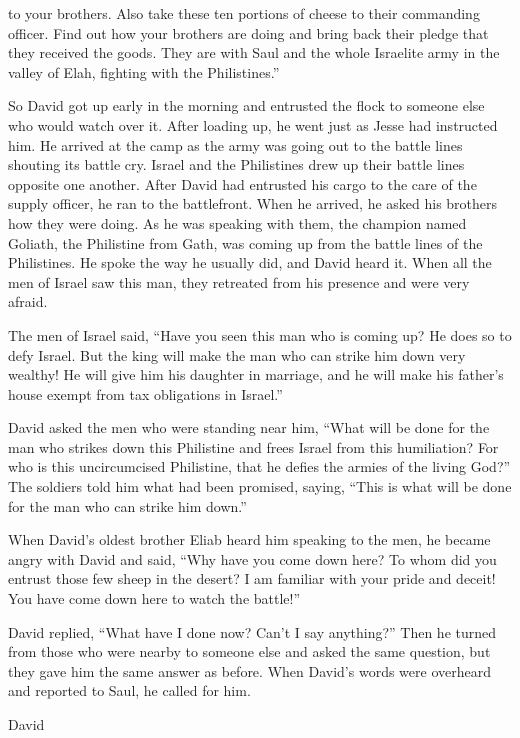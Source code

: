 {to your brothers.
Also take
these
ten
portions
of cheese
to their commanding officer.
Find out
how your brothers
are doing
and bring back their pledge
that they received the goods.
They are
with Saul
and the whole
Israelite
army in the valley
of Elah,
fighting
with
the Philistines.”
\par }{\PP {}So David
got up early
in the morning
and entrusted
the
flock
to someone else who would watch
over
it.
After loading up,
he went
just
as Jesse
had instructed
him. He arrived
at the camp
as the army
was going out
to
the battle lines
shouting
its battle
cry.
Israel
and the Philistines
drew up their battle lines opposite one another.
After David
had entrusted
his
cargo
to the care
of the supply officer, he ran
to the battlefront.
When he arrived,
he asked
his brothers
how they were doing.
As he
was speaking
with
them, the champion
named
Goliath,
the Philistine
from Gath,
was coming up
from the battle lines
of the Philistines.
He spoke
the way
he usually did, and David
heard it.
When all
the men
of Israel
saw
this man,
they retreated
from his presence
and were very
afraid.
\par }{\PP {}The men
of Israel
said,
“Have you seen
this
man
who is coming up? He does so
to defy
Israel.
But the king
will make
the man
who
can strike
him down
very
wealthy! He will give
him his daughter
in marriage, and he will make
his father’s
house
exempt
from tax obligations in Israel.”
\par }{\PP {}David
asked
the men
who were standing
near him,
“What
will be done
for the man
who
strikes
down this Philistine
and frees
Israel
from
this humiliation? For
who
is this
uncircumcised
Philistine,
that
he defies
the armies
of the living
God?”
The soldiers
told
him what
had been promised,
saying, “This
is what
will be done
for the man
who
can strike him down.”
\par }{\PP {}When David’s oldest
brother
Eliab
heard
him speaking
to
the men,
he
became
angry
with David
and said,
“Why
have you come down
here? To
whom
did you entrust
those few
sheep
in the desert? I am
familiar
with your pride
and deceit! You have come down
here to watch
the battle!”
\par }{\PP {}David
replied,
“What
have I done
now? Can’t
I say anything?”
Then he turned
from those
who were
nearby
to someone else
and asked the same question,
but they gave
him the same
answer
as
before.
When
David’s
words
were overheard
and reported
to Saul,
he called for him.
\par }{\PP {}David
}

